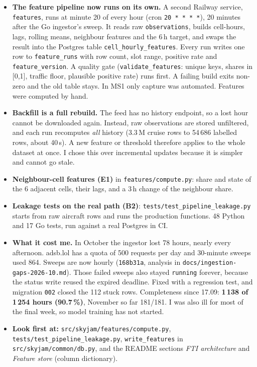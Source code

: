 \documentclass[10pt,a4paper]{article}
\newcommand{\code}[1]{\texttt{#1}}
\begin{document}
\begin{itemize}
\item \textbf{The feature pipeline now runs on its own.} A second Railway service,
  \code{features}, runs at minute 20 of every hour (cron \code{20 * * * *}), 20 minutes
  after the Go ingestor's sweep. It reads raw
  \code{observations}, builds cell-hours, lags, rolling means, neighbour features and
  the 6\,h target, and swaps the result into the Postgres table
  \code{cell\_hourly\_features}. Every run writes one row to \code{feature\_runs} with
  row count, slot range, positive rate and \code{feature\_version}. A quality gate
  (\code{validate\_features}: unique keys, shares in [0,1], traffic floor, plausible
  positive rate) runs first. A failing build exits non-zero and the old table stays. In
  MS1 only capture was automated. Features were computed by hand.
\item \textbf{Backfill is a full rebuild.} The feed has no history endpoint, so a lost
  hour cannot be downloaded again. Instead, raw observations are stored unfiltered, and
  each run recomputes \emph{all} history (3.3\,M cruise rows to 54\,686 labelled rows,
  about 40\,s). A new feature or threshold therefore applies to the whole dataset at once.
  I chose this over incremental updates because it is simpler and cannot go stale.
\item \textbf{Neighbour-cell features (E1)} in \code{features/compute.py}: share and
  state of the 6 adjacent cells, their lags, and a 3\,h change of the neighbour share.
\item \textbf{Leakage tests on the real path (B2)}:
  \code{tests/test\_pipeline\_leakage.py} starts from raw aircraft rows and runs the
  production functions. 48 Python and 17 Go tests, run against a real Postgres in CI.
\item \textbf{What it cost me.} In October the ingestor lost 78 hours, nearly every
  afternoon. adsb.lol has a quota of 500 requests per day and 30-minute sweeps used 864.
  Sweeps are now hourly (\code{168b31a}, analysis in
  \code{docs/ingestion-gaps-2026-10.md}). Those failed sweeps also stayed
  \code{running} forever, because the status write reused the expired deadline. Fixed with a
  regression test, and migration \code{002} closed the 112 stuck rows. Completeness since 17.09: \textbf{1\,138 of
  1\,254 hours (90.7\,\%)}, November so far 181/181. I was also ill for most of the
  final week, so model training has not started.
\item \textbf{Look first at:} \code{src/skyjam/features/compute.py},
  \code{tests/test\_pipeline\_leakage.py}, \code{write\_features} in
  \code{src/skyjam/common/db.py}, and the README sections \emph{FTI architecture} and
  \emph{Feature store} (column dictionary).
\end{itemize}
\end{document}
